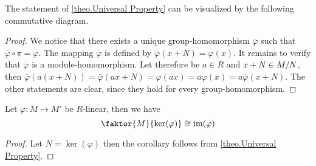 The statement of \cref{theo.Universal Property} can be visualized by the following commutative diagram.

\begin{center}
\end{center}


\begin{proof}
We notice that there exists a unique group-homomorphism $\overline{\varphi}$ such that $\overline{\varphi}\circ\pi=\varphi$. The mapping $\overline{\varphi}$ is defined by $\overline{\varphi}(x+N)=\varphi(x)$. It remains to verify that $\overline{\varphi}$ is a module-homomorphism. Let therefore be $a\in R$ and $x+N\in M/N$, then $\overline{\varphi}(a(x+N))=\overline{\varphi}(ax+N)=\varphi(ax)=a\varphi(x)=a\overline{\varphi}(x+N)$. The other statements are clear, since they hold for every group-homomorphism.
\end{proof}

\begin{cor} \label{cor.Homomorphism Theorem}
Let $\varphi\colon M\to M'$ be $R$-linear, then we have
\begin{equation*}
\faktor{M}{\ker(\varphi)}\cong\im(\varphi)
\end{equation*}
\end{cor}
\begin{proof}
Let $N=\ker(\varphi)$ then the corollary follows from \cref{theo.Universal Property}.
\end{proof}

